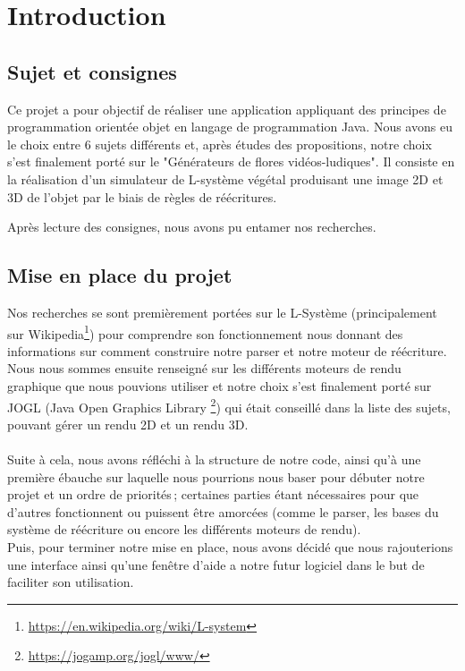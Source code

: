 \chapter{Introduction}

\section{Sujet et consignes}
Ce projet a pour objectif de réaliser une application appliquant des principes de programmation orientée objet en langage de programmation Java. Nous avons eu le choix entre 6 sujets différents et, après études des propositions, notre choix s’est finalement porté sur le "Générateurs de flores vidéos-ludiques". Il consiste en la réalisation d’un simulateur de L-système végétal produisant une image 2D et 3D de l’objet par le biais de règles de réécritures.


Après lecture des consignes, nous avons pu entamer nos recherches.

\section{Mise en place du projet}
\label{sec:MEPprog}
Nos recherches se sont premièrement portées sur le L-Système (principalement sur Wikipedia\footnote{\href{https://en.wikipedia.org/wiki/L-system}{https://en.wikipedia.org/wiki/L-system}}) pour comprendre son fonctionnement nous donnant des informations sur comment construire notre parser et notre moteur de réécriture. Nous nous sommes ensuite renseigné sur les différents moteurs de rendu graphique que nous pouvions utiliser et notre choix s'est finalement porté sur JOGL (Java Open Graphics Library \footnote{\href{https://jogamp.org/jogl/www/}{https://jogamp.org/jogl/www/}}) qui était conseillé dans la liste des sujets, pouvant gérer un rendu 2D et un rendu 3D.
\\
\\
Suite à cela, nous avons réfléchi à la structure de notre code, ainsi qu'à une première ébauche sur laquelle nous pourrions nous baser pour débuter notre projet et un ordre de priorités ; certaines parties étant nécessaires pour que d'autres fonctionnent ou puissent être amorcées (comme le parser, les bases du système de réécriture ou encore les différents moteurs de rendu).
\\
Puis, pour terminer notre mise en place, nous avons décidé que nous rajouterions une interface ainsi qu'une fenêtre d'aide a notre futur logiciel dans le but de faciliter son utilisation.


